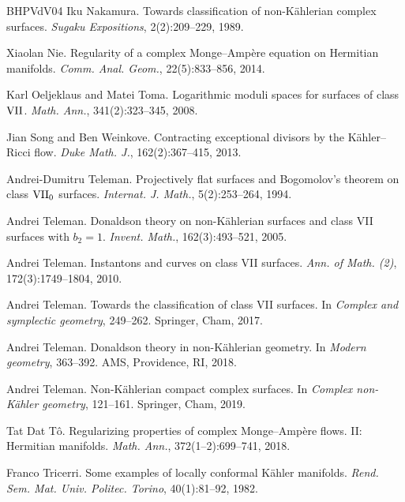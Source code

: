 \documentclass[12pt]{amsart}
\numberwithin{equation}{section}
\theoremstyle{remark}
\theoremstyle{definition}
\begin{document}
\begin{thebibliography}{BHPVdV04}
Iku Nakamura.
\newblock Towards classification of non-K\"ahlerian complex surfaces.
\newblock \emph{Sugaku Expositions}, 2(2):209--229, 1989.

Xiaolan Nie.
\newblock Regularity of a complex Monge--Amp\`ere equation on Hermitian manifolds.
\newblock \emph{Comm. Anal. Geom.}, 22(5):833--856, 2014.

Karl Oeljeklaus and Matei Toma.
\newblock Logarithmic moduli spaces for surfaces of class ${\rm VII}$.
\newblock \emph{Math. Ann.}, 341(2):323--345, 2008.

Jian Song and Ben Weinkove.
\newblock Contracting exceptional divisors by the K\"ahler--Ricci flow.
\newblock \emph{Duke Math. J.}, 162(2):367--415, 2013.

Andrei-Dumitru Teleman.
\newblock Projectively flat surfaces and Bogomolov's theorem on class ${\rm VII}_0$ surfaces.
\newblock \emph{Internat. J. Math.}, 5(2):253--264, 1994.

Andrei Teleman.
\newblock Donaldson theory on non-K\"ahlerian surfaces and class VII surfaces with $b_2=1$.
\newblock \emph{Invent. Math.}, 162(3):493--521, 2005.

Andrei Teleman.
\newblock Instantons and curves on class VII surfaces.
\newblock \emph{Ann. of Math. (2)}, 172(3):1749--1804, 2010.

Andrei Teleman.
\newblock Towards the classification of class VII surfaces.
\newblock In \emph{Complex and symplectic geometry}, 249--262. Springer, Cham, 2017.

Andrei Teleman.
\newblock Donaldson theory in non-K\"ahlerian geometry.
\newblock In \emph{Modern geometry}, 363--392. AMS, Providence, RI, 2018.

Andrei Teleman.
\newblock Non-K\"ahlerian compact complex surfaces.
\newblock In \emph{Complex non-K\"ahler geometry}, 121--161. Springer, Cham, 2019.

Tat Dat T\^o.
\newblock Regularizing properties of complex Monge--Amp\`ere flows. II: Hermitian manifolds.
\newblock \emph{Math. Ann.}, 372(1--2):699--741, 2018.

Franco Tricerri.
\newblock Some examples of locally conformal K\"ahler manifolds.
\newblock \emph{Rend. Sem. Mat. Univ. Politec. Torino}, 40(1):81--92, 1982.


\end{thebibliography}
\end{document}
